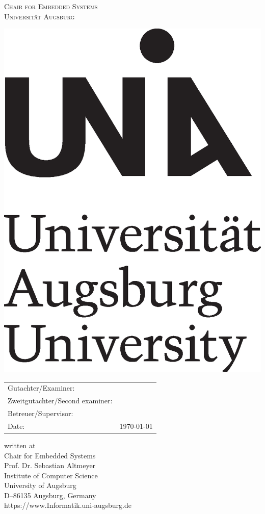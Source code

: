 \begin{titlepage}
	\centering
	{\scshape\LARGE Chair for  Embedded Systems \\ Universität Augsburg \par}
	\vspace{1cm}
	\includegraphics[scale=.25]{abbildungen/uni_logo.eps}\par
	\vspace{.5cm}
	{\Large \artDerAbschlussarbeit\par}
	\vspace{1.5cm}
	{\huge\bfseries \@title\par}
	\vspace{2cm}
	{\Large\itshape \@author\par}
	\vfill
	\begin{tabular}{ll}
		Gutachter/Examiner: &\gutachter\\
		Zweitgutachter/Second examiner:& \zweitgutachter\\
		Betreuer/Supervisor:& \betreuer\\
		Date:& \today\\
	\end{tabular}
\end{titlepage}

\vspace*{\fill}
written at\\
Chair for Embedded Systems\\
Prof. Dr. Sebastian Altmeyer\\
Institute of Computer Science\\
University of Augsburg\\
D–86135 Augsburg, Germany\\
https://www.Informatik.uni-augsburg.de